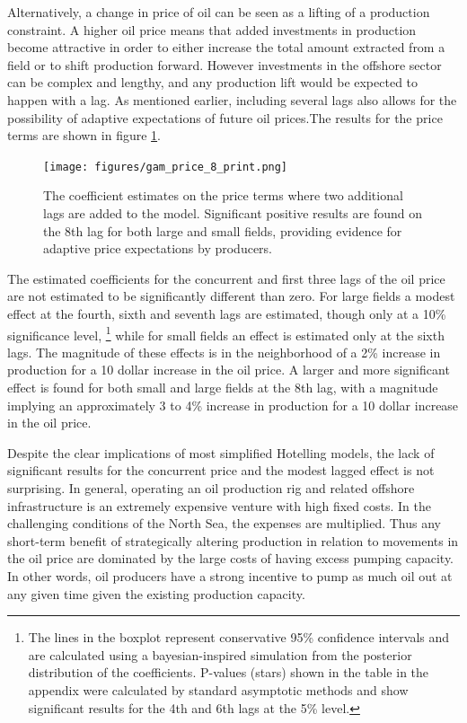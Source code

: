 \documentclass[11pt]{article}
\begin{document}
Alternatively, a change in price of oil can be seen as a lifting of a production constraint.  A higher oil price means that added investments in production become attractive in order to either increase the total amount extracted from a field or to shift production forward.  However investments in the offshore sector can be complex and lengthy, and any production lift would be expected to happen with a lag.  As mentioned earlier, including several lags also allows for the possibility of adaptive expectations of future oil prices.The results for the price terms are shown in figure \ref{gam_price_8}.

\begin{figure}
	\texttt{[image: figures/gam\_price\_8\_print.png]}
	\caption{The coefficient estimates on the price terms where two additional lags are added to the model.  Significant positive results are found on the 8th lag for both large and small fields, providing evidence for adaptive price expectations by producers.}
	\label{gam_price_8}
\end{figure}
 

The estimated coefficients for the concurrent and first three lags of the oil price are not estimated to be significantly different than zero.  For large fields a modest effect at the fourth, sixth and seventh lags are estimated, though only at a 10\% significance level, \footnote{The lines in the boxplot represent conservative 95\% confidence intervals and are calculated using a bayesian-inspired simulation from the posterior distribution of the coefficients.  P-values (stars) shown in the table in the appendix were calculated by standard asymptotic methods and show significant results for the 4th and 6th lags at the 5\% level.} while for small fields an effect is estimated only at the sixth lags. The magnitude of these effects is in the neighborhood of a 2\% increase in production for a 10 dollar increase in the oil price.  A larger and more significant effect is found for both small and large fields at the 8th lag, with a magnitude implying an approximately 3 to 4\% increase in production for a 10 dollar increase in the oil price.  

Despite the clear implications of most simplified Hotelling models, the lack of significant results for the concurrent price and the modest lagged effect is not surprising. In general, operating an oil production rig and related offshore infrastructure is an extremely expensive venture with high fixed costs.  In the challenging conditions of the North Sea, the expenses are multiplied.  Thus any short-term benefit of strategically altering production in relation to movements in the oil price are dominated by the large costs of having excess pumping capacity.  In other words, oil producers have a strong incentive to pump as much oil out at any given time given the existing production capacity.
\end{document}
